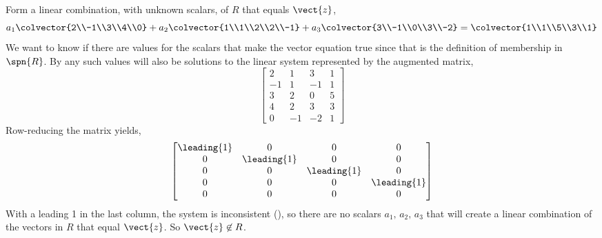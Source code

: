 Form a linear combination, with unknown scalars, of $R$ that equals $\vect{z}$,
%
\begin{equation*}
a_1\colvector{2\\-1\\3\\4\\0}+
a_2\colvector{1\\1\\2\\2\\-1}+
a_3\colvector{3\\-1\\0\\3\\-2}
=
\colvector{1\\1\\5\\3\\1}
\end{equation*}
%
We want to know if there are values for the scalars that make the vector equation true since that is the definition of membership in $\spn{R}$.  By  any such values will also be solutions to the linear system represented by the augmented matrix,
%
\begin{equation*}
\begin{bmatrix}
2 & 1 & 3 & 1\\
-1 & 1 & -1 & 1\\
3 & 2 & 0 & 5\\
4 & 2 & 3 & 3\\
0 & -1 & -2 & 1
\end{bmatrix}
\end{equation*}
%
Row-reducing the matrix yields,
%
\begin{equation*}
\begin{bmatrix}
\leading{1} & 0 & 0 & 0\\
0 & \leading{1} & 0 & 0\\
0 & 0 & \leading{1} & 0\\
0 & 0 & 0 & \leading{1}\\
0 & 0 & 0 & 0
\end{bmatrix}
\end{equation*}
%
With a leading 1 in the last column, the system is inconsistent (), so there are no scalars $a_1,\,a_2,\,a_3$ that will create a linear combination of the vectors in $R$ that equal $\vect{z}$.  So $\vect{z}\not\in R$.